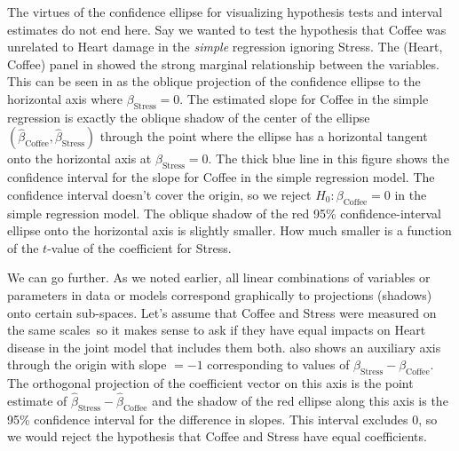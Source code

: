 The virtues of the confidence ellipse for visualizing hypothesis tests and interval estimates
do not end here. Say we wanted to test the hypothesis that Coffee was unrelated to Heart damage
in the \emph{simple} regression ignoring Stress.  The (Heart, Coffee) panel in 
showed the strong marginal relationship between the variables.  This can be seen in  as
the oblique projection of the confidence ellipse to the horizontal axis where $\beta_{\mathrm{Stress}}=0$.
The estimated slope for Coffee in the simple regression is exactly the oblique shadow of
the center of the ellipse $(\widehat{\beta}_{\mathrm{Coffee}}, \widehat{\beta}_{\mathrm{Stress}})$
through the point where the ellipse has a horizontal tangent onto the horizontal axis at
$\beta_{\mathrm{Stress}}=0$. The thick blue line in this figure shows the confidence interval
for the slope for Coffee in the simple regression model. The confidence interval doesn't cover the origin, so
we reject $H_0:\beta_{\mathrm{Coffee}} = 0$ in the simple regression model.
The oblique shadow of the red 95\% confidence-interval ellipse onto the horizontal axis
is slightly smaller.  How much smaller is a function of the $t$-value of the coefficient for Stress.


We can go further.  As we noted earlier, all linear combinations of variables or parameters
in data or models correspond graphically to projections (shadows) onto certain sub-spaces.
Let's assume that Coffee and Stress were measured on the same scales\, so it makes sense
to ask if they have equal impacts on Heart disease in the joint model that includes them both.
 also shows an auxiliary axis through the origin with slope $=-1$
corresponding to values of $\beta_{\mathrm{Stress}} - \beta_{\mathrm{Coffee}}$. The orthogonal
projection of the coefficient vector on this axis is the point estimate of
$\widehat{\beta}_{\mathrm{Stress}} - \widehat{\beta}_{\mathrm{Coffee}}$
and the shadow of the red ellipse along this axis is the 95\% confidence interval
for the difference in slopes. This interval excludes 0, so we would reject the hypothesis
that Coffee and Stress have equal coefficients.

